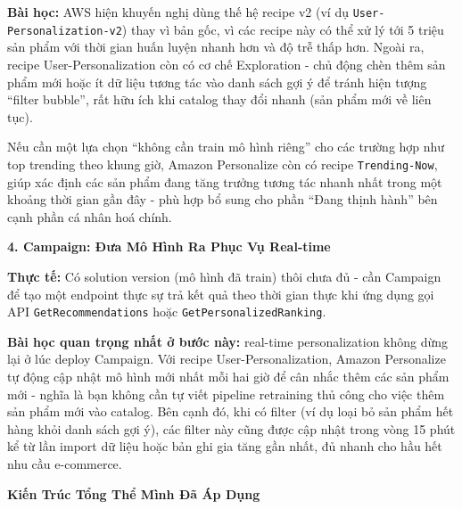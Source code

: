 \textbf{Bài học:} AWS hiện khuyến nghị dùng thế hệ recipe v2 (ví dụ
\texttt{User-Personalization-v2}) thay vì bản gốc, vì các recipe này có
thể xử lý tới 5 triệu sản phẩm với thời gian huấn luyện nhanh hơn và độ
trễ thấp hơn. Ngoài ra, recipe User-Personalization còn có cơ chế
Exploration - chủ động chèn thêm sản phẩm mới hoặc ít dữ liệu tương tác
vào danh sách gợi ý để tránh hiện tượng ``filter bubble'', rất hữu ích
khi catalog thay đổi nhanh (sản phẩm mới về liên tục).

Nếu cần một lựa chọn ``không cần train mô hình riêng'' cho các trường
hợp như top trending theo khung giờ, Amazon Personalize còn có recipe
\texttt{Trending-Now}, giúp xác định các sản phẩm đang tăng trưởng tương
tác nhanh nhất trong một khoảng thời gian gần đây - phù hợp bổ sung cho
phần ``Đang thịnh hành'' bên cạnh phần cá nhân hoá chính.

\vspace{0.5em}\noindent\textbf{4. Campaign: Đưa Mô Hình Ra Phục Vụ
Real-time}\par

\textbf{Thực tế:} Có solution version (mô hình đã train) thôi chưa đủ -
cần Campaign để tạo một endpoint thực sự trả kết quả theo thời gian thực
khi ứng dụng gọi API \texttt{GetRecommendations} hoặc
\texttt{GetPersonalizedRanking}.

\textbf{Bài học quan trọng nhất ở bước này:} real-time personalization
không dừng lại ở lúc deploy Campaign. Với recipe User-Personalization,
Amazon Personalize tự động cập nhật mô hình mới nhất mỗi hai giờ để cân
nhắc thêm các sản phẩm mới - nghĩa là bạn không cần tự viết pipeline
retraining thủ công cho việc thêm sản phẩm mới vào catalog. Bên cạnh đó,
khi có filter (ví dụ loại bỏ sản phẩm hết hàng khỏi danh sách gợi ý),
các filter này cũng được cập nhật trong vòng 15 phút kể từ lần import dữ
liệu hoặc bản ghi gia tăng gần nhất, đủ nhanh cho hầu hết nhu cầu
e-commerce.

\vspace{0.5em}\noindent\textbf{Kiến Trúc Tổng Thể Mình Đã Áp
Dụng}\par

\begin{Shaded}
\begin{Highlighting}[]
\end{Highlighting}
\end{Shaded}

